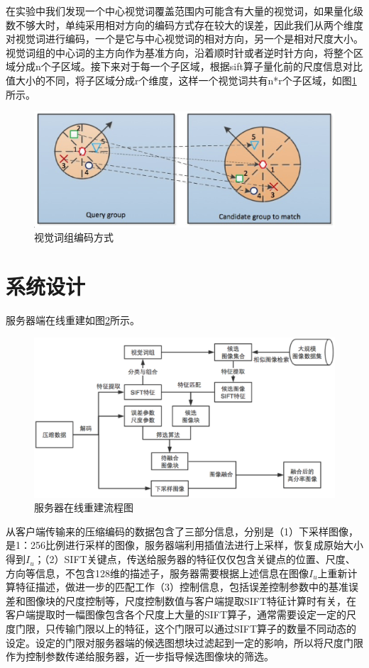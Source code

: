 \documentclass[UTF8]{csoarticle}
\begin{document}
在实验中我们发现一个中心视觉词覆盖范围内可能含有大量的视觉词，如果量化级数不够大时，单纯采用相对方向的编码方式存在较大的误差，因此我们从两个维度对视觉词进行编码，一个是它与中心视觉词的相对方向，另一个是相对尺度大小。视觉词组的中心词的主方向作为基准方向，沿着顺时针或者逆时针方向，将整个区域分成n个子区域。接下来对于每一个子区域，根据sift算子量化前的尺度信息对比值大小的不同，将子区域分成r个维度，这样一个视觉词共有n*r个子区域，如图\ref{fig:visual}所示。

\begin{figure}
\centering\includegraphics[width=12cm]{visual_group}
\caption{视觉词组编码方式}
\label{fig:visual}
\end{figure}

\section{系统设计}

服务器端在线重建如图\ref{fig:serverOnline}所示。
\begin{figure}
\centering\includegraphics[width=15cm]{serverOnline}
\caption{服务器在线重建流程图}
\label{fig:serverOnline}
\end{figure}

从客户端传输来的压缩编码的数据包含了三部分信息，分别是（1）下采样图像，是1：256比例进行采样的图像，服务器端利用插值法进行上采样，恢复成原始大小得到\(I_u\)；（2）SIFT关键点，传送给服务器的特征仅仅包含关键点的位置、尺度、方向等信息，不包含128维的描述子，服务器需要根据上述信息在图像\(I_u\)上重新计算特征描述，做进一步的匹配工作（3）控制信息，包括误差控制参数中的基准误差和图像块的尺度控制等，尺度控制数值与客户端提取SIFT特征计算时有关，在客户端提取时一幅图像包含各个尺度上大量的SIFT算子，通常需要设定一定的尺度门限，只传输门限以上的特征，这个门限可以通过SIFT算子的数量不同动态的设定。设定的门限对服务器端的候选图想块过滤起到一定的影响，所以将尺度门限作为控制参数传递给服务器，近一步指导候选图像块的筛选。
\end{document}
